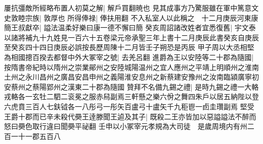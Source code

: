屢抗彊敵所經略布置人初莫之解|{
	解戶買翻暁也}
見其成事方乃驚服雖在軍中篤意文史敦睦宗族|{
	敦厚也}
所得俸禄|{
	俸扶用翻}
不入私室人以此稱之　十二月庚辰河東康簡王叔獻卒|{
	謚法温柔好樂曰康一德不懈曰簡}
癸亥周詔諸改姓者宜悉復舊|{
	宇文泰以諸將補九十九姓見一百六十五卷梁元帝承聖三年上書十二月庚辰此書癸亥自庚辰至癸亥四十四日庚辰必誤按長歷周陳十二月皆壬子朔恐是丙辰}
甲子周以大丞相堅為相國摠百揆去都督中外大冢宰之號|{
	去羌呂翻}
進爵為王以安陸等二十郡為隨國|{
	按隋書帝紀時以隋州之崇業鄖州之安陸城陽温州之宜人應州之平靖上明順州之淮南土州之永川昌州之廣昌安昌申州之義陽淮安息州之新蔡建安豫州之汝南臨潁廣寧初安蔡州之蔡陽郢州之漢東二十郡為隨國}
贊拜不名備九錫之禮|{
	是時九錫之禮一大輅戎輅各一玄牡二駟二衮冕之服赤舄副焉三軒懸之樂六佾之舞四朱戶以居五納陛以登六虎賁三百人七鈇钺各一八彤弓一彤矢百盧弓十盧矢千九秬鬯一卣圭瓚副焉}
堅受王爵十郡而已辛未殺代奰王逹滕聞王逌及其子|{
	既殺二王亦皆加以惡謚謚法不醉而怒曰奰色取行違曰聞奰平祕翻}
壬申以小冢宰元孝規為大司徒　是歲周境内有州二百一十一郡五百八

